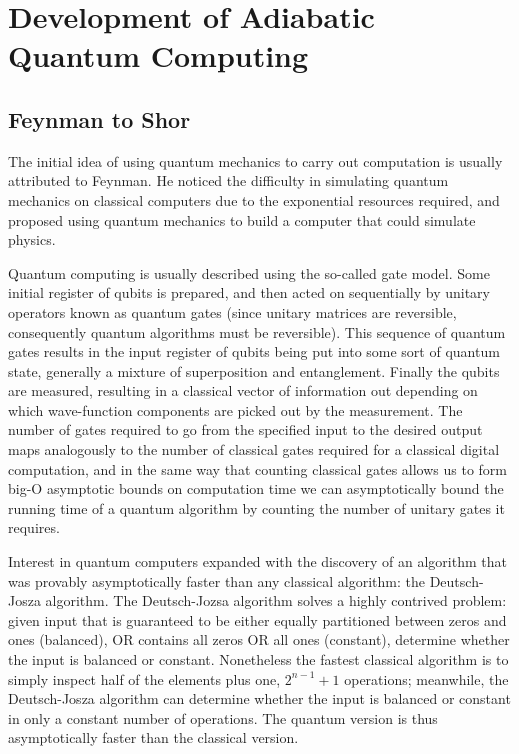\chapter{Development of Adiabatic Quantum Computing}
\section{Feynman to Shor}
The initial idea of using quantum mechanics to carry out computation is usually attributed to Feynman.\cite{feynman}  He noticed the difficulty in simulating quantum mechanics on classical computers due to the exponential resources required, and proposed using quantum mechanics to build a computer that could simulate physics.

Quantum computing is usually described using the so-called gate model.\cite{qc}  Some initial register of qubits is prepared, and then acted on sequentially by unitary operators known as quantum gates (since unitary matrices are reversible, consequently quantum algorithms must be reversible).  This sequence of quantum gates results in the input register of qubits being put into some sort of quantum state, generally a mixture of superposition and entanglement.  Finally the qubits are measured, resulting in a classical vector of information out depending on which wave-function components are picked out by the measurement.  The number of gates required to go from the specified input to the desired output maps analogously to the number of classical gates required for a classical digital computation, and in the same way that counting classical gates allows us to form big-O asymptotic bounds on computation time we can asymptotically bound the running time of a quantum algorithm by counting the number of unitary gates it requires.

Interest in quantum computers expanded with the discovery of an algorithm that was provably asymptotically faster than any classical algorithm: the Deutsch-Josza algorithm.\cite{deutsch}  The Deutsch-Jozsa algorithm solves a highly contrived problem: given input that is guaranteed to be either equally partitioned between zeros and ones (balanced), OR contains all zeros OR all ones (constant), determine whether the input is balanced or constant.  Nonetheless the fastest classical algorithm is to simply inspect half of the elements plus one, $2^{n-1} + 1$ operations; meanwhile, the Deutsch-Josza algorithm can determine whether the input is balanced or constant in only a constant number of operations.  The quantum version is thus asymptotically faster than the classical version.

